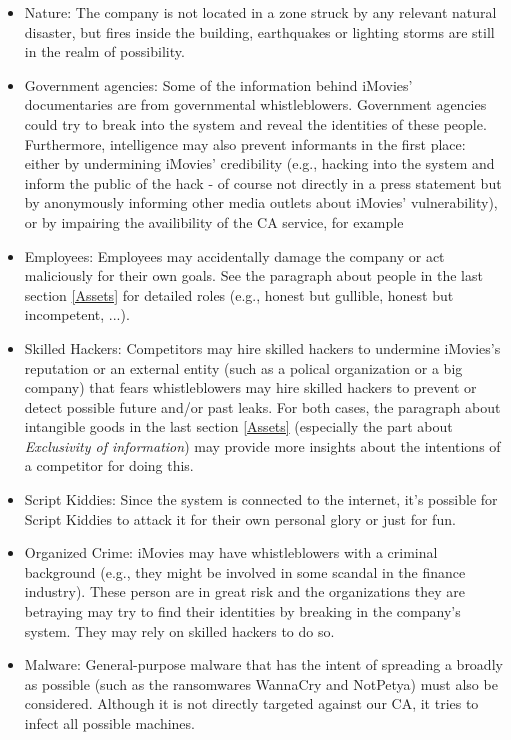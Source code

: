 \documentclass[english]{article}
\begin{document}
\begin{itemize}

	\item Nature: The company is not located in a zone struck by any relevant natural disaster, but fires inside the building, earthquakes or lighting storms are still in the realm of possibility.
  \item Government agencies: Some of the information behind iMovies' documentaries are from governmental whistleblowers. Government agencies could try to break into the system and reveal the identities of these people. Furthermore, intelligence may also prevent informants in the first place: either by undermining iMovies' credibility (e.g., hacking into the system and inform the public of the hack - of course not directly in a press statement but by anonymously informing other media outlets about iMovies' vulnerability), or by impairing the availibility of the CA service, for example
  \item Employees: Employees may accidentally damage the company or act maliciously for their own goals. See the paragraph about people in the last section \ref{Assets} for detailed roles (e.g., honest but gullible, honest but incompetent, ...).
  \item Skilled Hackers: Competitors may hire skilled hackers to undermine iMovies's reputation or an external entity (such as a polical organization or a big company) that fears whistleblowers may hire skilled hackers to prevent or detect possible future and/or past leaks. For both cases, the paragraph about intangible goods in the last section \ref{Assets} (especially the part about \textit{Exclusivity of information}) may provide more insights about the intentions of a competitor for doing this.
	\item Script Kiddies: Since the system is connected to the internet, it's possible for Script Kiddies to attack it for their own personal glory or just for fun.
  \item Organized Crime: iMovies may have whistleblowers with a criminal background (e.g., they might be involved in some scandal in the finance industry). These person are in great risk and the organizations they are betraying may try to find their identities by breaking in the company's system. They may rely on skilled hackers to do so.
  \item Malware: General-purpose malware that has the intent of spreading a broadly as possible (such as the ransomwares WannaCry and NotPetya) must also be considered. Although it is not directly targeted against our CA, it tries to infect all possible machines.

\end{itemize}
\end{document}
